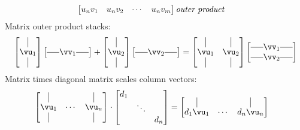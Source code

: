 \documentclass[a4paper,11pt]{exam}
\newcounter{ct}
\newcommand{\horzbar}{\rule[.5ex]{1.5em}{0.4pt}}
\begin{document}
\begin{tcolorbox}[colback=black!1!,title=Matrix Fun Facts]
\begin{align}
\begin{bmatrix}
	u_n v_1 & u_n v_2 & \cdots & u_n v_m
    \end{bmatrix}
    \,&
    \text{\emph{outer product}}
\end{align}
Matrix outer product stacks:
\begin{align}
    \begin{bmatrix}
	\kern.3em\vline\kern.3em \\
	\vu_1 \\
	\kern.3em\vline\kern.3em
    \end{bmatrix}
    \begin{bmatrix}
	\horzbar \vv_1 \horzbar
    \end{bmatrix}
    +
    \begin{bmatrix}
	\kern.3em\vline\kern.3em \\
	\vu_2 \\
	\kern.3em\vline\kern.3em
    \end{bmatrix}
    \begin{bmatrix}
	\horzbar \vv_2 \horzbar
    \end{bmatrix}
    =
    \begin{bmatrix}
	\kern.3em\vline\kern.3em
	&
	\kern.3em\vline\kern.3em
	\\
	\vu_1 & \vu_2 \\
	\kern.3em\vline\kern.3em
	&
	\kern.3em\vline\kern.3em
    \end{bmatrix}
    \begin{bmatrix}
	\horzbar \vv_1 \horzbar \\
	\horzbar \vv_2 \horzbar
    \end{bmatrix}
\end{align}
%
Matrix times diagonal matrix scales column vectors:
\begin{align}
    \begin{bmatrix}
	\kern.3em\vline\kern.3em
	&
	&
	\kern.3em\vline\kern.3em
	\\
	\vu_1 & \cdots & \vu_n \\
	\kern.3em\vline\kern.3em
	&
	&
	\kern.3em\vline\kern.3em
    \end{bmatrix}
    \cdot
    \begin{bmatrix}
	d_1 & & \\
	    & \ddots & \\
	    & & d_n
    \end{bmatrix}
    &=
    \begin{bmatrix}
	\kern.3em\vline\kern.3em
	&
	&
	\kern.3em\vline\kern.3em
	\\
	d_1 \vu_1 & \cdots & d_n \vu_n \\

\end{bmatrix}
\end{align}
\end{tcolorbox}
\end{document}
